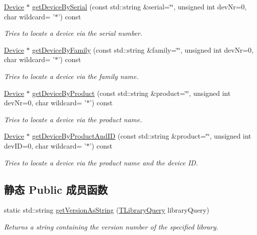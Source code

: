 \begin{DoxyCompactItemize}
\hyperlink{classmv_i_m_p_a_c_t_1_1acquire_1_1_device}{Device} $\ast$ \hyperlink{classmv_i_m_p_a_c_t_1_1acquire_1_1_device_manager_a7bf58516da0597acf3d899981e52aa92}{get\+Device\+By\+Serial} (const std\+::string \&serial=\char`\"{}\char`\"{}, unsigned int dev\+Nr=0, char wildcard= '$\ast$') const 
\begin{DoxyCompactList}\small\item\em Tries to locate a device via the serial number. \end{DoxyCompactList}\item 
\hyperlink{classmv_i_m_p_a_c_t_1_1acquire_1_1_device}{Device} $\ast$ \hyperlink{classmv_i_m_p_a_c_t_1_1acquire_1_1_device_manager_a8ffbf3573bd8836d2583b271b5f43834}{get\+Device\+By\+Family} (const std\+::string \&family=\char`\"{}\char`\"{}, unsigned int dev\+Nr=0, char wildcard= '$\ast$') const 
\begin{DoxyCompactList}\small\item\em Tries to locate a device via the family name. \end{DoxyCompactList}\item 
\hyperlink{classmv_i_m_p_a_c_t_1_1acquire_1_1_device}{Device} $\ast$ \hyperlink{classmv_i_m_p_a_c_t_1_1acquire_1_1_device_manager_a61b35d3c0ebbf79dc15d8704d6e772ad}{get\+Device\+By\+Product} (const std\+::string \&product=\char`\"{}\char`\"{}, unsigned int dev\+Nr=0, char wildcard= '$\ast$') const 
\begin{DoxyCompactList}\small\item\em Tries to locate a device via the product name. \end{DoxyCompactList}\item 
\hyperlink{classmv_i_m_p_a_c_t_1_1acquire_1_1_device}{Device} $\ast$ \hyperlink{classmv_i_m_p_a_c_t_1_1acquire_1_1_device_manager_ad92a73317e3dbd9443c3a7dd8bff6118}{get\+Device\+By\+Product\+And\+I\+D} (const std\+::string \&product=\char`\"{}\char`\"{}, unsigned int dev\+I\+D=0, char wildcard= '$\ast$') const 
\begin{DoxyCompactList}\small\item\em Tries to locate a device via the product name and the device I\+D. \end{DoxyCompactList}\end{DoxyCompactItemize}
\subsection*{静态 Public 成员函数}
\begin{DoxyCompactItemize}
\item 
static std\+::string \hyperlink{classmv_i_m_p_a_c_t_1_1acquire_1_1_device_manager_a3fa7d36d6b440b785db9c21e4a9f9567}{get\+Version\+As\+String} (\hyperlink{group___common_interface_gaa0089595ddb29525273fab145356014c}{T\+Library\+Query} library\+Query)
\begin{DoxyCompactList}\small\item\em Returns a string containing the version number of the specified library. \end{DoxyCompactList}\end{DoxyCompactItemize}


